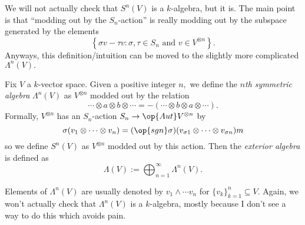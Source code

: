 We will not actually check that $S^n(V)$ is a $k$-algebra, but it is. The main point is that ``modding out by the $S_n$-action'' is really modding out by the subspace generated by the elements
\[\left\{\sigma v-\tau v:\sigma,\tau\in S_n\text{ and }v\in V^{\otimes n}\right\}.\]
Anyways, this definition/intuition can be moved to the slightly more complicated $\Lambda^n(V).$
\begin{definition}
	Fix $V$ a $k$-vector space. Given a positive integer $n,$ we define the \textit{$n$th symmetric algebra} $\Lambda^n(V)$ as $V^{\otimes n}$ modded out by the relation
	\[\cdots\otimes a\otimes b\otimes\cdots=-(\cdots\otimes b\otimes a\otimes\cdots).\]
	Formally, $V^{\otimes n}$ has an $S_n$-action $S_n\to\op{Aut}V^{\otimes n}$ by
	\[\sigma(v_1\otimes\cdots\otimes v_n)=(\op{sgn}\sigma)(v_{\sigma1}\otimes\cdots\otimes v_{\sigma n})m\]
	so we define $S^n(V)$ as $V^{\otimes n}$ modded out by this action. Then the \textit{exterior algebra} is defined as
	\[\Lambda(V):=\bigoplus_{n=1}^\infty\Lambda^n(V).\]
\end{definition}
Elements of $\Lambda^n(V)$ are usually denoted by $v_1\wedge\cdots v_n$ for $\{v_k\}_{k=1}^n\subseteq V.$ Again, we won't actually check that $\Lambda^n(V)$ is a $k$-algebra, mostly because I don't see a way to do this which avoids pain.

